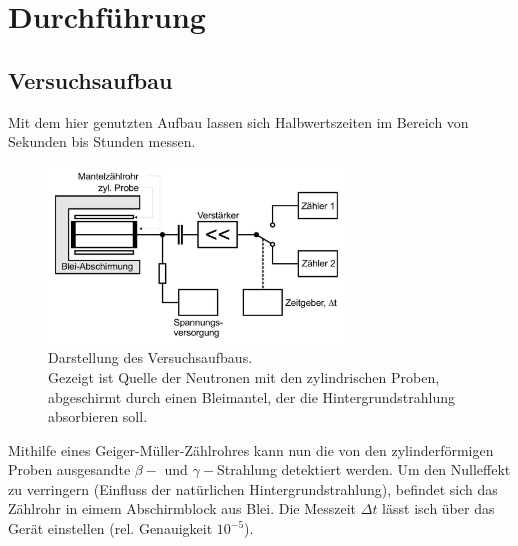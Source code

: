 \newpage
\section{Durchführung}
\label{sec:Durchfuehrung}
\subsection{Versuchsaufbau}
Mit dem hier genutzten Aufbau lassen sich Halbwertszeiten im Bereich von Sekunden bis Stunden messen.
\begin{figure}
    \centering
    \includegraphics[width=0.7\textwidth]{bilder/Versuchsaufbau.jpg}
    \caption{Darstellung des Versuchsaufbaus.\\
    Gezeigt ist Quelle der Neutronen mit den zylindrischen Proben, abgeschirmt durch einen Bleimantel,
    der die Hintergrundstrahlung absorbieren soll.\cite[217]{anleitung}}
\end{figure}

Mithilfe eines Geiger-Müller-Zählrohres kann nun die von den zylinderförmigen Proben 
ausgesandte $\beta-$ und $\gamma-$Strahlung detektiert werden. 
Um den Nulleffekt zu verringern (Einfluss der natürlichen Hintergrundstrahlung),
befindet sich das Zählrohr in eimem Abschirmblock aus Blei.
Die Messzeit $\Delta t$ lässt isch über das Gerät einstellen (rel. Genauigkeit $10^{-5}$).
